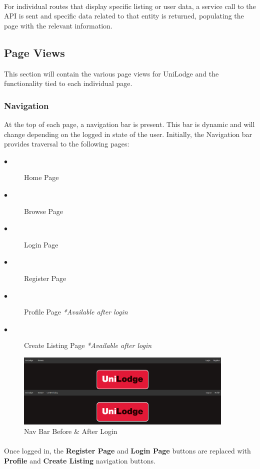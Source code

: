 \paragraph{}
For individual routes that display specific listing or user data, a service call to the API is sent and specific data related to that entity is returned, populating the page with the relevant information.

\subsection{Page Views}
This section will contain the various page views for UniLodge and the functionality tied to each individual page.

\subsubsection{Navigation}
At the top of each page, a navigation bar is present. This bar is dynamic and will change depending on the logged in state of the user. Initially, the Navigation bar provides traversal to the following pages:

\begin{description}
  \item[$\bullet$] Home Page
  \item[$\bullet$] Browse Page
  \item[$\bullet$] Login Page
  \item[$\bullet$] Register Page
  \item[$\bullet$] Profile Page \textit{*Available after login}
  \item[$\bullet$] Create Listing Page \textit{*Available after login}
\end{description}

\begin{figure}[H]
	\caption{Nav Bar Before \& After Login}
	\label{image:home}
	\centering
	\includegraphics[width=0.93\textwidth]{images/navbar.png}
\end{figure}

\paragraph{}
Once logged in, the \textbf{Register Page} and \textbf{Login Page} buttons are replaced with \textbf{Profile} and \textbf{Create Listing} navigation buttons.


